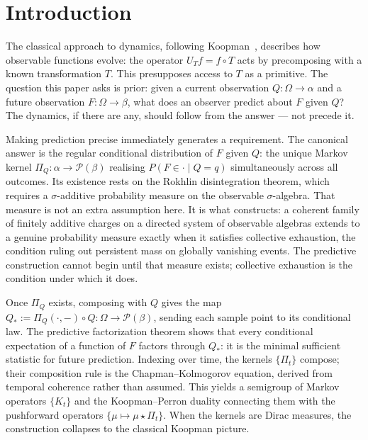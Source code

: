 \section{Introduction}
\label{sec:intro}

The classical approach to dynamics, following Koopman~\cite{Koopman1931},
describes how observable functions evolve: the operator $U_T f = f \circ T$
acts by precomposing with a known transformation $T$.  This presupposes access
to $T$ as a primitive.  The question this paper asks is prior: given a current
observation $Q : \Omega \to \alpha$ and a future observation $F : \Omega \to
\beta$, what does an observer predict about $F$ given $Q$?  The dynamics, if
there are any, should follow from the answer — not precede it.

Making prediction precise immediately generates a requirement.  The canonical
answer is the regular conditional distribution of $F$ given $Q$: the unique
Markov kernel $\Pi_Q : \alpha \to \mathcal{P}(\beta)$ realising
$P(F \in \cdot \mid Q = q)$ simultaneously across all outcomes.  Its existence
rests on the Rokhlin disintegration theorem, which requires a $\sigma$-additive
probability measure on the observable $\sigma$-algebra.  That measure is not an
extra assumption here.  It is what \cite{mahon_paper1} constructs: a coherent
family of finitely additive charges on a directed system of observable algebras
extends to a genuine probability measure exactly when it satisfies collective
exhaustion, the condition ruling out persistent mass on globally vanishing
events.  The predictive construction cannot begin until that measure exists;
collective exhaustion is the condition under which it does.

Once $\Pi_Q$ exists, composing with $Q$ gives the map
$Q_* := \Pi_Q(\cdot, -) \circ Q : \Omega \to \mathcal{P}(\beta)$, sending each
sample point to its conditional law.  The predictive factorization theorem shows
that every conditional expectation of a function of $F$ factors through $Q_*$:
it is the minimal sufficient statistic for future prediction.  Indexing over
time, the kernels $\{\Pi_t\}$ compose; their composition rule is the
Chapman--Kolmogorov equation, derived from temporal coherence rather than
assumed.  This yields a semigroup of Markov operators $\{K_t\}$ and the
Koopman--Perron duality connecting them with the pushforward operators
$\{\mu \mapsto \mu \star \Pi_t\}$.  When the kernels are Dirac measures, the
construction collapses to the classical Koopman picture.

